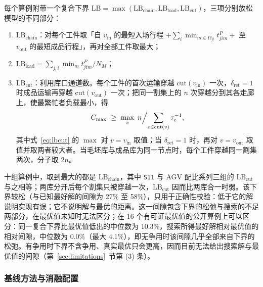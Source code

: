 \documentclass[manuscript,screen,review]{acmart}
\newcommand{\LBGapLo}{27\%}
\newcommand{\LBGapHi}{58\%}
\newcommand{\PubNOpt}{16}                 %
\newcommand{\PubLBSlack}{10.3\%}          %
\newcommand{\PubLBResidMed}{0.0}          %
\newcommand{\PubLBResidMax}{4.1}          %
\begin{document}
每个算例附带一个复合下界 $\mathrm{LB}=\max(\mathrm{LB}_{\text{chain}},\mathrm{LB}_{\text{load}},\mathrm{LB}_{\text{cut}})$，三项分别放松模型的不同部分：
\begin{enumerate}[label=(\roman*),leftmargin=*,topsep=2pt,itemsep=1pt]
  \item $\mathrm{LB}_{\text{chain}}$：对每个工件取「自 $v_{\mathrm{in}}$ 的最短入场行程 $+\sum_i \min_{m\in\Omega_{ji}}t^P_{jim}+$ 至 $v_{\mathrm{out}}$ 的最短成品行程」，再对全部工件取最大；
  \item $\mathrm{LB}_{\text{load}}=\sum_{j,i}\min_m t^P_{jim}/N_M$；
  \item $\mathrm{LB}_{\text{cut}}$：利用库口通道数。每个工件的首次运输穿越 $\mathrm{cut}(v_{\mathrm{in}})$ 一次，$\delta_{\mathrm{ret}}=1$ 时成品运输再穿越 $\mathrm{cut}(v_{\mathrm{out}})$ 一次；把同一割集上的 $n$ 次穿越分到其各走廊上，使最繁忙者负载最小，得
\begin{equation}
\label{eq:lbcut}
C_{\max}\ \ge\ \max_{v}\ n\Bigl/\sum_{e\in \mathrm{cut}(v)}\tau_e^{-1},
\end{equation}
其中式~\eqref{eq:lbcut} 的 $\max$ 对 $v=v_{\mathrm{in}}$ 取值；当 $\delta_{\mathrm{ret}}=1$ 时，再对 $v=v_{\mathrm{out}}$ 取值并取两者较大者。当毛坯库与成品库为同一节点时，每个工件穿越同一割集两次，分子取 $2n$。
\end{enumerate}
十组算例中，取到最大的都是 $\mathrm{LB}_{\text{chain}}$，其中 \texttt{S11} 与 AGV 配比系列三组的 $\mathrm{LB}_{\text{cut}}$ 与之相等；两库分开后每个割集只被穿越一次，$\mathrm{LB}_{\text{cut}}$ 因而比两库合一时弱。该下界较松（与已知最好解的间隙为 \LBGapLo{} 至 \LBGapHi{}），只用于正确性校验：低于它的解说明实现有误；它不说明解与最优的距离。这一间隙包含下界的松弛与搜索的不足两部分，在最优值未知时无法区分；在 \PubNOpt{} 个有可证最优值的公开算例上可以区分：同一复合下界比最优值低出的中位数为 \PubLBSlack{}，搜索所得最好解相对最优值的相对间隙，中位数为 $\PubLBResidMed\%$（最大 $\PubLBResidMax\%$），即无争用时该间隙几乎全部来自下界的松弛。有争用时下界不含争用、真实最优只会更高，因而目前无法给出搜索解与最优值的间隙（第~\ref{sec:limitations}~节第 (3) 条）。

\subsubsection{基线方法与消融配置}
\label{sec:arms}
\end{document}
